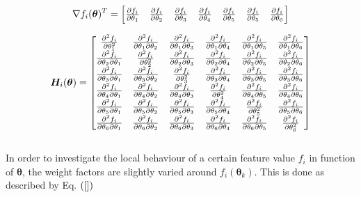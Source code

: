 \begin{equation}\label{eq:Grad}
\centering
\nabla f_i(\bm{\theta})^T = 
\begin{bmatrix}
\pdv{f_i}{\theta_1} & \pdv{f_i}{\theta_2} & \pdv{f_i}{\theta_3} & \pdv{f_i}{\theta_4} &\pdv{f_i}{\theta_5} & \pdv{f_i}{\theta_5} & \pdv{f_i}{\theta_6}
\end{bmatrix}
\end{equation}

\begin{equation}\label{eq:Hess}
\centering
\bm{H}_i(\bm{\theta}) = 
\begin{bmatrix}

 \pdv[2]{f_i}{\theta_1} & \pdv{f_i}{\theta_1}{\theta_2}& \pdv{f_i}{\theta_1}{\theta_3}& \pdv{f_i}{\theta_1}{\theta_4}& \pdv{f_i}{\theta_1}{\theta_5}& \pdv{f_i}{\theta_1}{\theta_6}\\
 
  \pdv{f_i}{\theta_2}{\theta_1}&\pdv[2]{f_i}{\theta_2} & \pdv{f_i}{\theta_2}{\theta_3}& \pdv{f_i}{\theta_2}{\theta_4}&\pdv{f_i}{\theta_2}{\theta_5}&\pdv{f_i}{\theta_2}{\theta_6}\\
  
  \pdv{f_i}{\theta_3}{\theta_1}&\pdv{f_i}{\theta_3}{\theta_2}&\pdv[2]{f_i}{\theta_3} &  \pdv{f_i}{\theta_3}{\theta_4}&\pdv{f_i}{\theta_3}{\theta_5}&\pdv{f_i}{\theta_3}{\theta_6}\\
  
  \pdv{f_i}{\theta_4}{\theta_1}&\pdv{f_i}{\theta_4}{\theta_2} &  \pdv{f_i}{\theta_4}{\theta_3}&\pdv[2]{f_i}{\theta_4}&\pdv{f_i}{\theta_4}{\theta_5}&\pdv{f_i}{\theta_4}{\theta_6}\\
  
  \pdv{f_i}{\theta_5}{\theta_1}&\pdv{f_i}{\theta_5}{\theta_2} &  \pdv{f_i}{\theta_5}{\theta_3}&\pdv{f_i}{\theta_5}{\theta_4}&\pdv[2]{f_i}{\theta_5}&\pdv{f_i}{\theta_5}{\theta_6}\\
  
  \pdv{f_i}{\theta_6}{\theta_1}&\pdv{f_i}{\theta_6}{\theta_2} &  \pdv{f_i}{\theta_6}{\theta_3}&\pdv{f_i}{\theta_6}{\theta_4}&\pdv{f_i}{\theta_6}{\theta_5}&\pdv[2]{f_i}{\theta_6}

\end{bmatrix}
\end{equation}\\

In order to investigate the local behaviour of a certain feature value $f_i$ in function of $\bm{\theta}$, the weight factors are slightly varied around $f_i(\bm{\theta}_k)$. This is done as described by Eq. $(\ref{})$ 





